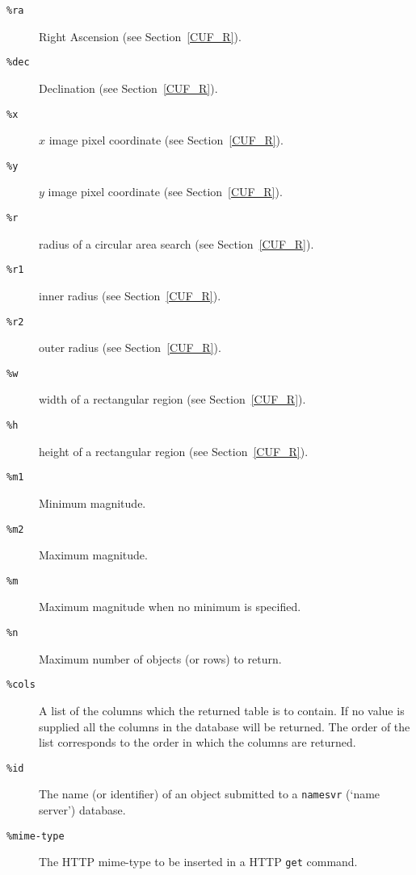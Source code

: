 \documentclass[twoside,11pt]{article}
\renewcommand{\_}{\texttt{\symbol{95}}}
\begin{document}
\begin{description}

  \item[{\tt \%ra}] Right Ascension (see Section~\ref{CUF_R}).

  \item[{\tt \%dec}] Declination (see Section~\ref{CUF_R}).

  \item[{\tt \%x}] $x$\/ image pixel coordinate (see Section~\ref{CUF_R}).

  \item[{\tt \%y}] $y$\/ image pixel coordinate (see Section~\ref{CUF_R}).

  \item[{\tt \%r}] radius of a circular area search (see Section~\ref{CUF_R}).

  \item[{\tt \%r1}] inner radius (see Section~\ref{CUF_R}).

  \item[{\tt \%r2}] outer radius (see Section~\ref{CUF_R}).

  \item[{\tt \%w}] width of a rectangular region (see Section~\ref{CUF_R}).

  \item[{\tt \%h}] height of a rectangular region (see Section~\ref{CUF_R}).

  \item[{\tt \%m1}] Minimum magnitude.

  \item[{\tt \%m2}] Maximum magnitude.

  \item[{\tt \%m}] Maximum magnitude when no minimum is specified.

  \item[{\tt \%n}] Maximum number of objects (or rows) to return.

  \item[{\tt \%cols }] A list of the columns which the returned table
   is to contain.  If no value is supplied all the columns in the
   database will be returned.  The order of the list corresponds to the
   order in which the columns are returned.

  \item[{\tt \%id }] The name (or identifier) of an object submitted to
   a {\tt namesvr} (`name server') database.

  \item[{\tt \%mime-type}] The HTTP mime-type to be inserted in a HTTP
   {\tt get} command.


\end{description}
\end{document}

